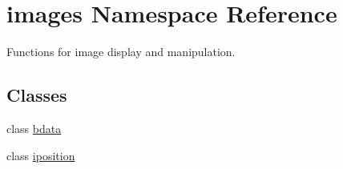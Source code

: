 \hypertarget{namespaceimages}{}\section{images Namespace Reference}
\label{namespaceimages}


Functions for image display and manipulation.  


\subsection*{Classes}
\begin{DoxyCompactItemize}
\item 
class \hyperlink{classimages_1_1bdata}{bdata}
\item 
class \hyperlink{classimages_1_1iposition}{iposition}
\end{DoxyCompactItemize}
